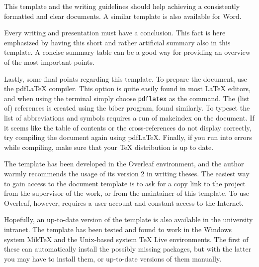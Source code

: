 This template and the writing guidelines should help achieving a consistently formatted and clear documents. A similar template is also available for Word.

Every writing and presentation must have a conclusion. This fact is here emphasized by having this short and rather artificial summary also in this template. A concise summary table can be a good way for providing an overview of the most important points.

Lastly, some final points regarding this template. To prepare the document, use the pdf\LaTeX{} compiler. This option is quite easily found in most \LaTeX{} editors, and when using the terminal simply choose \texttt{pdflatex} as the command. The (list of) references is created using the biber program, found similarly. To typeset the list of abbreviations and symbols requires a run of makeindex on the document. If it seems like the table of contents or the cross-references do not display correctly, try compiling the document again using pdf\LaTeX{}. Finally, if you run into errors while compiling, make sure that your \TeX{} distribution is up to date.

The template has been developed in the Overleaf environment, and the author warmly recommends the usage of its version 2 in writing theses. The easiest way to gain access to the document template is to ask for a copy link to the project from the supervisor of the work, or from the maintainer of this template. To use Overleaf, however, requires a user account and constant access to the Internet.

Hopefully, an up-to-date version of the template is also available in the university intranet. The template has been tested and found to work in the Windows system Mik\TeX{} and the Unix-based system \TeX{} Live environments. The first of these can automatically install the possibly missing packages, but with the latter you may have to install them, or up-to-date versions of them manually.
